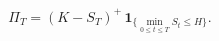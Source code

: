 \documentclass{equation-sheet}
\begin{document}
\begin{equation*}
\Pi_T=(K-S_T)^{+}\,
\mathbf{1}_{\{\min_{0\leq t\leq T}S_t\leq H\}}.
\end{equation*}
\end{document}
